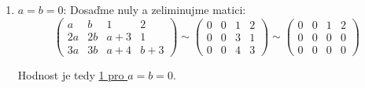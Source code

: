 \documentclass[12pt]{article}
\begin{document}
\begin{enumerate}
\begin{enumerate}
        Tento tvar jsme už jednou viděli a víme, že ho můžeme elementárními úpravami převést do následujícího tvaru
        nezávisle na $a$ (nepoužili jsme nikde $a^{-1}$):

        \[
          \left( \begin{array}{cccc}
            1 & 0 & 0 & 0 \\
            0 & 0 & a+1 & 2 \\
            0 & 0 & 0 & b
          \end{array} \right)
        \]

        $b$ je nenulové, pak tedy můžeme prvek čtvrtého sloupce druhého řádku vynulovat jako v 1.a.iii.:

        \[
          \left( \begin{array}{cccc}
            1 & 0 & 0 & 0 \\
            0 & 0 & a+1 & 0 \\
            0 & 0 & 0 & 1
          \end{array} \right)
        \]

        Pak je zjevně hodnost \underline{2 pro $b\neq0, a=4$}, \underline{3 pro $b\neq0, a\neq4$} -- což nám zesiluje tvrzení z 1.a.iii.,
        protože pro hodnost 3 je přípustné $a=0$.
      
      \item $a=b=0$: Dosaďme nuly a zeliminujme matici:
          \[
            \left( \begin{array}{cccc}
              a & b & 1 & 2 \\
              2a & 2b & a+3 & 1 \\
              3a & 3b & a+4 & b+3
            \end{array} \right)
            \sim
            \left( \begin{array}{cccc}
              0 & 0 & 1 & 2 \\
              0 & 0 & 3 & 1 \\
              0 & 0 & 4 & 3
            \end{array} \right)
            \sim 
            \left( \begin{array}{cccc}
              0 & 0 & 1 & 2 \\
              0 & 0 & 0 & 0 \\
              0 & 0 & 0 & 0
            \end{array} \right)
          \]

        Hodnost je tedy \underline{1 pro $a=b=0$}.
 

\end{enumerate}
\end{enumerate}
\end{document}
